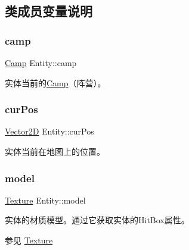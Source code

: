 \subsection{类成员变量说明}
\mbox{\label{class_entity_a5326accd49d3817310ec90692b9da3df}} 
\subsubsection{\texorpdfstring{camp}{camp}}
{\footnotesize\ttfamily \hyperlink{_entity_8h_ad54c4fe39f1c51b786c24ae0b7763b44}{Camp} Entity\+::camp\hspace{0.3cm}{\ttfamily [protected]}}



实体当前的\hyperlink{_entity_8h_ad54c4fe39f1c51b786c24ae0b7763b44}{Camp}（阵营）。 

\mbox{\label{class_entity_a5031aa6b058f2231daad16b35e3d536d}} 
\subsubsection{\texorpdfstring{cur\+Pos}{curPos}}
{\footnotesize\ttfamily \hyperlink{_vector2_d_8hpp_aa1f1145650f1dd9bddf7335ec6434d7c}{Vector2D} Entity\+::cur\+Pos\hspace{0.3cm}{\ttfamily [protected]}}



实体当前在地图上的位置。 

\mbox{\label{class_entity_a22ccba8fb86e5b4e10b2c33b6f56d238}} 
\subsubsection{\texorpdfstring{model}{model}}
{\footnotesize\ttfamily \hyperlink{struct_texture}{Texture} Entity\+::model\hspace{0.3cm}{\ttfamily [protected]}}



实体的材质模型。通过它获取实体的\+Hit\+Box属性。\begin{DoxySeeAlso}{参见}
\hyperlink{struct_texture}{Texture}


\end{DoxySeeAlso}


